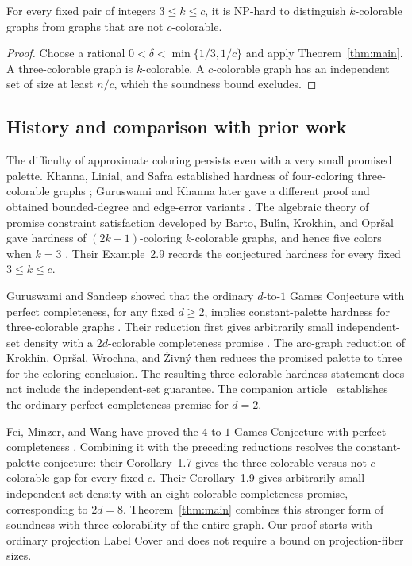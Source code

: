 \begin{corollary}\label{cor:coloring}
For every fixed pair of integers $3\le k\le c$, it is NP-hard to
distinguish $k$-colorable graphs from graphs that are not $c$-colorable.
\end{corollary}

\begin{proof}
Choose a rational $0<\delta<\min\{1/3,1/c\}$ and apply
Theorem~\ref{thm:main}. A three-colorable graph is $k$-colorable.
A $c$-colorable graph has an independent set of size at least $n/c$,
which the soundness bound excludes.
\end{proof}

\subsection{History and comparison with prior work}

The difficulty of approximate coloring persists even with a very small
promised palette. Khanna, Linial, and Safra established hardness of
four-coloring three-colorable graphs \cite{KhannaLinialSafra2000};
Guruswami and Khanna later gave a different proof and obtained
bounded-degree and edge-error variants \cite{GuruswamiKhanna2004}.
The algebraic theory of promise constraint satisfaction developed by
Barto, Bul\'{\i}n, Krokhin, and Opr\v{s}al gave hardness of
$(2k-1)$-coloring $k$-colorable graphs, and hence five colors when
$k=3$ \cite[Theorem~6.5]{BartoBulinKrokhinOprsal2021}.
Their Example~2.9 records the conjectured hardness for every fixed
$3\le k\le c$.

Guruswami and Sandeep showed that the ordinary $d$-to-$1$ Games
Conjecture with perfect completeness, for any fixed $d\ge2$, implies
constant-palette hardness for three-colorable graphs
\cite[Theorem~1]{GuruswamiSandeep2020}.
Their reduction first gives arbitrarily small independent-set density
with a $2d$-colorable completeness promise
\cite[Theorem~9]{GuruswamiSandeep2020}. The arc-graph reduction of
Krokhin, Opr\v{s}al, Wrochna, and \v{Z}ivn\'y
\cite[Theorem~1.8]{KrokhinOprsalWrochnaZivny2023} then reduces the
promised palette to three for the coloring conclusion. The resulting
three-colorable hardness statement does not include the independent-set
guarantee.
The companion article~\cite[Theorem~1.1]{OpenAIPerfectCompleteness2026}
establishes the ordinary perfect-completeness premise for $d=2$.

Fei, Minzer, and Wang have proved the $4$-to-$1$ Games Conjecture
with perfect completeness \cite[Theorem~1.6]{FeiMinzerWang2026}.
Combining it with the preceding reductions resolves the constant-palette
conjecture: their Corollary~1.7 gives the three-colorable versus not
$c$-colorable gap for every fixed $c$. Their Corollary~1.9 gives
arbitrarily small independent-set density with an eight-colorable
completeness promise, corresponding to $2d=8$.
Theorem~\ref{thm:main} combines this stronger form of soundness with
three-colorability of the entire graph. Our proof starts with ordinary
projection Label Cover and does not require a bound on projection-fiber
sizes.

